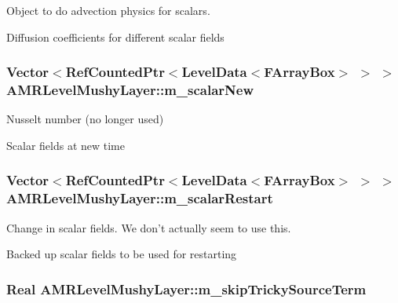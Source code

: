Object to do advection physics for scalars. 

Diffusion coefficients for different scalar fields \hypertarget{class_a_m_r_level_mushy_layer_a4937b8d2fdcfb86d57b7f197f91f5069}{
\subsubsection[{m\-\_\-scalar\-New}]{\setlength{\rightskip}{0pt plus 5cm}Vector$<$Ref\-Counted\-Ptr$<$Level\-Data$<$F\-Array\-Box$>$ $>$ $>$ A\-M\-R\-Level\-Mushy\-Layer\-::m\-\_\-scalar\-New\hspace{0.3cm}{\ttfamily [protected]}}}\label{class_a_m_r_level_mushy_layer_a4937b8d2fdcfb86d57b7f197f91f5069}


Nusselt number (no longer used) 

Scalar fields at new time \hypertarget{class_a_m_r_level_mushy_layer_a05741bcf973b908f3defe7aa3de6dcc8}{
\subsubsection[{m\-\_\-scalar\-Restart}]{\setlength{\rightskip}{0pt plus 5cm}Vector$<$Ref\-Counted\-Ptr$<$Level\-Data$<$F\-Array\-Box$>$ $>$ $>$ A\-M\-R\-Level\-Mushy\-Layer\-::m\-\_\-scalar\-Restart\hspace{0.3cm}{\ttfamily [protected]}}}\label{class_a_m_r_level_mushy_layer_a05741bcf973b908f3defe7aa3de6dcc8}


Change in scalar fields. We don't actually seem to use this. 

Backed up scalar fields to be used for restarting \hypertarget{class_a_m_r_level_mushy_layer_abe5e093bac71759f0e5b37c64d91b6cc}{
\subsubsection[{m\-\_\-skip\-Tricky\-Source\-Term}]{\setlength{\rightskip}{0pt plus 5cm}Real A\-M\-R\-Level\-Mushy\-Layer\-::m\-\_\-skip\-Tricky\-Source\-Term\hspace{0.3cm}{\ttfamily [protected]}}}\label{class_a_m_r_level_mushy_layer_abe5e093bac71759f0e5b37c64d91b6cc}


